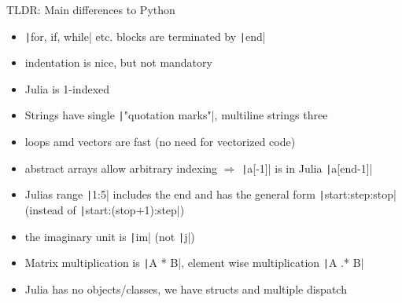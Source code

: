 \documentclass[aspectratio=169, 11pt, handout]{beamer}
\begin{document}
    \begin{frame}[fragile]{TLDR: Main differences to Python}
        \begin{itemize}
            \item \texttt|for, if, while| etc. blocks are terminated by  \texttt|end|
            \pause
            \item indentation is nice, but not mandatory
            \pause
            \item \alert{Julia is 1-indexed}
            \pause
            \item Strings have single \texttt|"quotation marks"|, multiline strings three
            \pause
            \item loops amd vectors are fast (no need for vectorized code)
            \pause
            \item abstract arrays allow arbitrary indexing $\Rightarrow$ \texttt|a[-1]| is in Julia \texttt|a[end-1]|
            \pause
            \item Julias range \texttt|1:5| includes the end and has the general form \texttt|start:step:stop| (instead of \texttt|start:(stop+1):step|)
            \pause
            \item the imaginary unit is \texttt|im| (not \texttt|j|)
            \pause
            \item Matrix multiplication is \texttt|A * B|, element wise multiplication \texttt|A .* B|
            \pause
            \item Julia has no objects/classes, we have structs and multiple dispatch
        \end{itemize}
    \end{frame}
\end{document}

